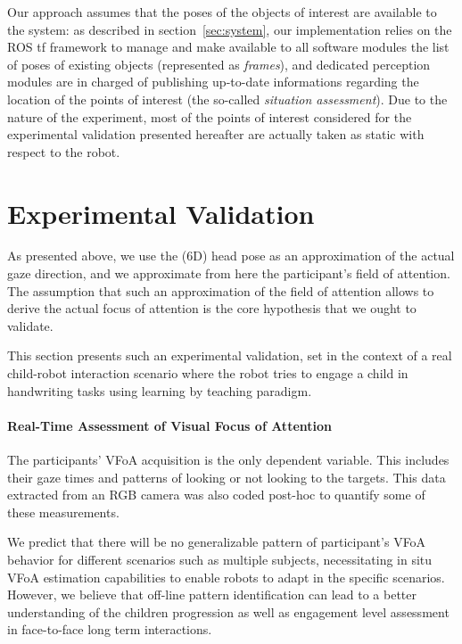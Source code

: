 \documentclass{sig-alternate}
\begin{document}
Our approach assumes that the poses of the objects of interest are available to
the system: as described in section~\ref{sec:system}, our implementation relies
on the ROS {\sc tf} framework to manage and make available to all software
modules the list of poses of existing objects (represented as {\it frames}), and
dedicated perception modules are in charged of publishing up-to-date
informations regarding the location of the points of interest (the so-called
\emph{situation assessment}). Due to the nature of the experiment, most of the
points of interest considered for the experimental validation presented
hereafter are actually taken as static with respect to the robot.


\section{Experimental Validation}

As presented above, we use the (6D) head pose as an approximation of the
actual gaze direction, and we approximate from here the participant's field of
attention. The assumption that such an approximation of the field of attention
allows to derive the actual focus of attention is the core hypothesis that we
ought to validate.

This section presents such an experimental validation, set in the context of a
real child-robot interaction scenario where the robot tries to engage a child in
handwriting tasks using learning by teaching paradigm.

\paragraph{Real-Time Assessment of Visual Focus of Attention}

The participants' VFoA acquisition is the only dependent variable. This includes
their gaze times and patterns of looking or not looking to the targets. This
data extracted from an RGB camera was also coded post-hoc to quantify some of
these measurements.

We predict that there will be no generalizable pattern of participant's VFoA
behavior for different scenarios such as multiple subjects, necessitating in
situ VFoA estimation capabilities to enable robots to adapt in the specific
scenarios. However, we believe that off-line pattern identification can lead to
a better understanding of the children progression as well as engagement level
assessment in face-to-face long term interactions.
\end{document}
